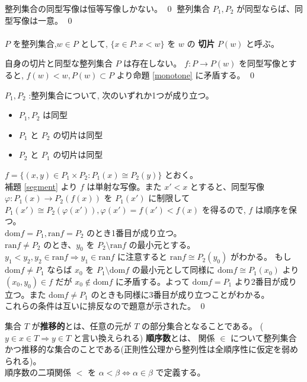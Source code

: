 \documentclass[dvipdfmx,a4paper]{jsreport}
\makeatletter
\theoremstyle{definition}
\renewcommand{\phi}{\varphi}
\let\sectionorig\section
\def\@sectionorig#1{\sectionorig*{\MakeUppercase{#1}}}
\def\@@sectionorig#1{\sectionorig{\MakeUppercase{#1}}}
\renewcommand{\section}{\@ifstar{\@sectionorig}{\@@sectionorig}}
\makeatother
\begin{document}
\cor 整列集合の同型写像は恒等写像しかない。 \qed
\cor 整列集合 $P_1,P_2$ が同型ならば、同型写像は一意。 \qed \\
\\
$P$ を整列集合,$w \in P$ として, $\{x \in P \colon x<w \}$ を $w$ の \textbf{切片} $P(w)$ と呼ぶ。

\lem\label{segment} 自身の切片と同型な整列集合 $P$ は存在しない。
\prf $f:P \to P(w)$ を同型写像とすると, $f(w)<w,P(w) \subset P$ より命題 \ref{monotone} に矛盾する。 \qed

\thm $P_1,P_2$ :整列集合について, 次のいずれか1つが成り立つ。
\begin{itemize}
    \item $P_1,P_2$ は同型
    \item $P_1$ と $P_2$ の切片は同型
    \item $P_2$ と $P_1$ の切片は同型
\end{itemize}
\prf $f=\{(x,y) \in P_1 \times P_2 \colon P_1(x) \cong P_2(y)\}$ とおく。 \\
補題 \ref{segment} より $f$ は単射な写像。また $x'<x$ とすると、同型写像 $\phi:P_1(x) \to P_2(f(x))$ を $P_1(x')$ に制限して $P_1(x') \cong P_2(\phi(x')),\phi(x')=f(x')<f(x)$ を得るので, $f$ は順序を保つ。 \\
$\mbox{dom} f=P_1,\mbox{ran} f=P_2$ のとき1番目が成り立つ。 \\
$\mbox{ran}f \neq P_2$ のとき、$y_0$ を $P_2 \setminus \mbox{ran}f$ の最小元とする。 $y_1<y_2,y_2 \in \mbox{ran}f \Rightarrow y_1 \in \mbox{ran} f$ に注意すると $\mbox{ran}f \cong P_2(y_0)$ がわかる。 もし $\mbox{dom}f \neq P_1$ ならば $x_0$ を $P_1 \setminus \mbox{dom} f$ の最小元として同様に $\mbox{dom}f \cong P_1(x_0)$ より $(x_0,y_0) \in f$ だが $x_0 \notin \mbox{dom}f$ に矛盾する。よって $\mbox{dom}f=P_1$ より2番目が成り立つ。また $\mbox{dom}f \neq P_1$ のときも同様に3番目が成り立つことがわかる。 \\
これらの条件は互いに排反なので題意が示された。 \qed 

\section{順序数の定義}
 集合 $T$ が\textbf{推移的}とは、任意の元が $T$ の部分集合となることである。 ( $y \in x \in T \Rightarrow y \in T$ と言い換えられる)
 \textbf{順序数}とは、 関係 $\in$ について整列集合かつ推移的な集合のことである(正則性公理から整列性は全順序性に仮定を弱められる)。 \\
順序数の二項関係 $<$ を $\alpha < \beta \iff \alpha \in \beta$ で定義する。
\end{document}
